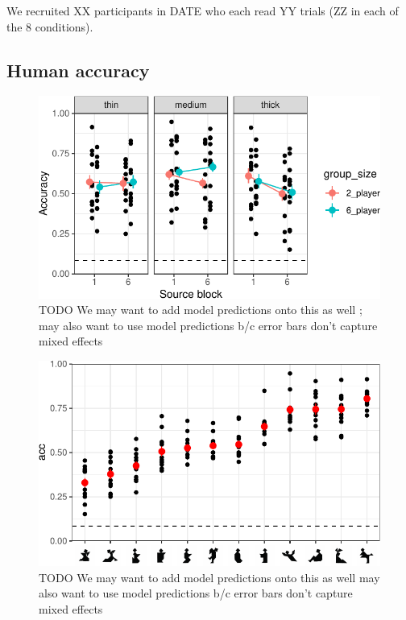 \documentclass[10pt, letterpaper]{article}
\begin{document}
We recruited XX participants in DATE who each read YY trials (ZZ in each
of the 8 conditions).

\subsection{Human accuracy}\label{human-accuracy}

\begin{CodeChunk}
\begin{figure}[t]

{\centering \includegraphics[width=1\linewidth]{figs/fig-1-1} 

}

\caption[TODO We may want to add model predictions onto this as well ]{TODO We may want to add model predictions onto this as well ; may also want to use model predictions b/c error bars don't capture mixed effects \label{TODO}}\label{fig:fig-1}
\end{figure}
\end{CodeChunk}

\begin{CodeChunk}
\begin{figure}[t]

{\centering \includegraphics[width=1\linewidth]{figs/fig-2-1} 

}

\caption[TODO We may want to add model predictions onto this as well may also want to use model predictions b/c error bars don't capture mixed effects \label{TODO2}]{TODO We may want to add model predictions onto this as well may also want to use model predictions b/c error bars don't capture mixed effects \label{TODO2}}\label{fig:fig-2}
\end{figure}
\end{CodeChunk}
\end{document}

